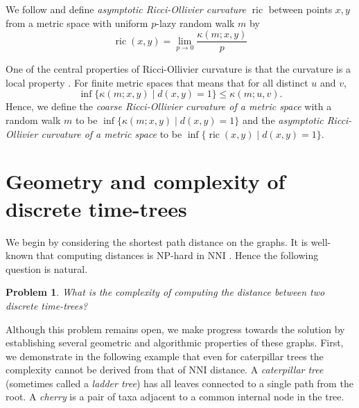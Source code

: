 \documentclass[11pt]{amsart}
\newtheorem{problem}[lemma]{Problem}
\theoremstyle{definition}
\newcommand{\nni}{\mathrm{NNI}}
\newcommand{\ric}{\operatorname{ric}}
\begin{document}
{We follow \textcite{Loisel2014-gu} and define \emph{asymptotic Ricci-Ollivier curvature} $\ric$ between points $x,y$ from a metric space with uniform $p$-lazy random walk $m$ by
\[
\ric(x,y) = \lim_{p\to0} \frac{\kappa(m;x,y)}{p}
\]

One of the central properties of Ricci-Ollivier curvature is that the curvature is a local property \autocite{Ollivier2009-cj}.
For finite metric spaces that means that for all distinct $u$ and $v$,
\[
\inf\{\kappa(m;x,y)\mid d(x,y) = 1\} \leq \kappa(m;u,v).
\]
Hence, we define the \emph{coarse Ricci-Ollivier curvature of a metric space} with a random walk $m$ to be $\inf\{\kappa(m;x,y)\mid d(x,y) = 1\}$ and the \emph{asymptotic Ricci-Ollivier curvature of a metric space} to be $\inf\{\ric(x,y)\mid d(x,y) = 1\}$.
}{}


\section{Geometry and complexity of discrete time-trees}

We begin by considering the shortest path distance on the graphs.
It is well-known that computing distances is NP-hard in $\nni$ \autocite{Dasgupta2000-xa}.
Hence the following question is natural.

\begin{problem}
\label{problemComplexity}
What is the complexity of computing the distance between two discrete time-trees?
\end{problem}

Although this problem remains open, we make progress towards the solution by establishing several geometric and algorithmic properties of these graphs.
First, we demonstrate in the following example that even for caterpillar trees the complexity cannot be derived from that of $\nni$ distance.
A \emph{caterpillar tree} (sometimes called a \emph{ladder tree}) has all leaves connected to a single path from the root.
A \emph{cherry} is a pair of taxa adjacent to a common internal node in the tree.
\end{document}

